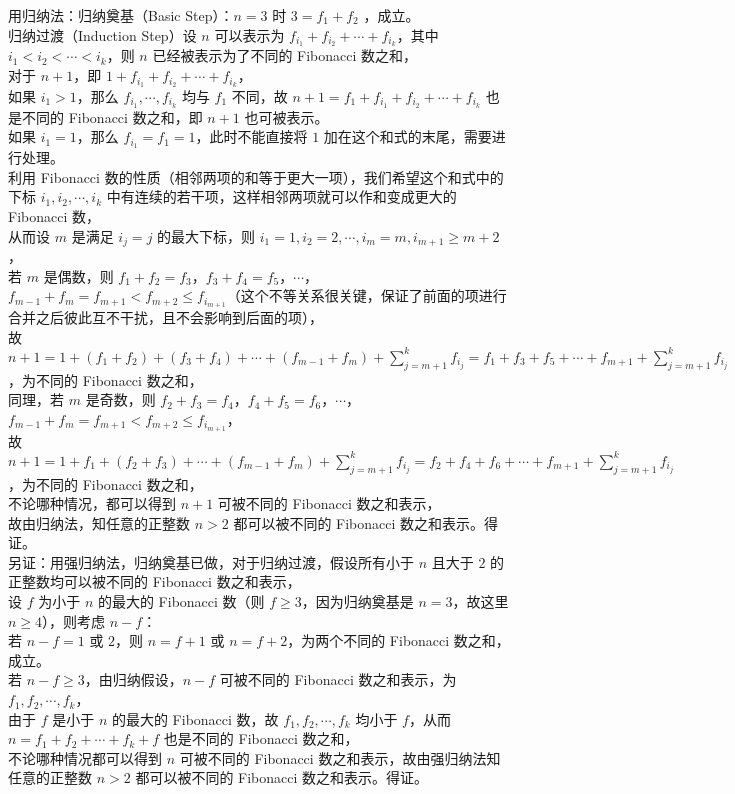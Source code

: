 \documentclass{ctexbook}
\begin{document}
\begin{enumerate}
    用归纳法：归纳奠基（Basic Step）：$n=3$ 时 $3=f_1+f_2$ ，成立。\\
    归纳过渡（Induction Step）设 $n$ 可以表示为 $f_{i_1}+f_{i_2}+\cdots+f_{i_k}$，其中 $i_1<i_2<\cdots<i_k$，则 $n$ 已经被表示为了不同的 Fibonacci 数之和，\\
    对于 $n+1$，即 $1+f_{i_1}+f_{i_2}+\cdots+f_{i_k}$，\\
    如果 $i_1>1$，那么 $f_{i_1},\cdots,f_{i_k}$ 均与 $f_1$ 不同，故 $n+1=f_1+f_{i_1}+f_{i_2}+\cdots+f_{i_k}$ 也是不同的 Fibonacci 数之和，即 $n+1$ 也可被表示。 \\
    如果 $i_1=1$，那么 $f_{i_1}=f_1=1$，此时不能直接将 $1$ 加在这个和式的末尾，需要进行处理。\\
    利用 Fibonacci 数的性质（相邻两项的和等于更大一项），我们希望这个和式中的下标 $i_1,i_2,\cdots,i_k$ 中有连续的若干项，这样相邻两项就可以作和变成更大的 Fibonacci 数，\\
    从而设 $m$ 是满足 $i_j=j$ 的最大下标，则 $i_1=1,i_2=2,\cdots,i_m=m,i_{m+1}\geq m+2$，\\
    若 $m$ 是偶数，则 $f_1+f_2=f_3$，$f_3+f_4=f_5$，$\cdots$，$f_{m-1}+f_m=f_{m+1}<f_{m+2}\leq f_{i_{m+1}}$（这个不等关系很关键，保证了前面的项进行合并之后彼此互不干扰，且不会影响到后面的项），\\
    故 $n+1=1+(f_1+f_2)+(f_3+f_4)+\cdots+(f_{m-1}+f_m)+\displaystyle\sum_{j=m+1}^k f_{i_j}=f_1+f_3+f_5+\cdots+f_{m+1}+\displaystyle\sum_{j=m+1}^k f_{i_j}$，为不同的 Fibonacci 数之和，\\
    同理，若 $m$ 是奇数，则 $f_2+f_3=f_4$，$f_4+f_5=f_6$，$\cdots$，$f_{m-1}+f_m=f_{m+1}<f_{m+2}\leq f_{i_{m+1}}$，\\
    故 $n+1=1+f_1+(f_2+f_3)+\cdots+(f_{m-1}+f_m)+\displaystyle\sum_{j=m+1}^k f_{i_j}=f_2+f_4+f_6+\cdots+f_{m+1}+\displaystyle\sum_{j=m+1}^k f_{i_j}$，为不同的 Fibonacci 数之和，\\
    不论哪种情况，都可以得到 $n+1$ 可被不同的 Fibonacci 数之和表示，\\
    故由归纳法，知任意的正整数 $n>2$ 都可以被不同的 Fibonacci 数之和表示。得证。\\
    \vspace{1em}
    另证：用强归纳法，归纳奠基已做，对于归纳过渡，假设所有小于 $n$ 且大于 $2$ 的正整数均可以被不同的 Fibonacci 数之和表示，\\
    设 $f$ 为小于 $n$ 的最大的 Fibonacci 数（则 $f\geq 3$，因为归纳奠基是 $n=3$，故这里 $n\geq 4$），则考虑 $n-f$： \\
    若 $n-f=1$ 或 $2$，则 $n=f+1$ 或 $n=f+2$，为两个不同的 Fibonacci 数之和，成立。\\
    若 $n-f\geq 3$，由归纳假设，$n-f$ 可被不同的 Fibonacci 数之和表示，为 $f_1,f_2,\cdots,f_k$，\\
    由于 $f$ 是小于 $n$ 的最大的 Fibonacci 数，故 $f_1,f_2,\cdots,f_k$ 均小于 $f$，从而 $n=f_1+f_2+\cdots+f_k+f$ 也是不同的 Fibonacci 数之和，\\
    不论哪种情况都可以得到 $n$ 可被不同的 Fibonacci 数之和表示，故由强归纳法知任意的正整数 $n>2$ 都可以被不同的 Fibonacci 数之和表示。得证。
\end{enumerate}
\end{document}
